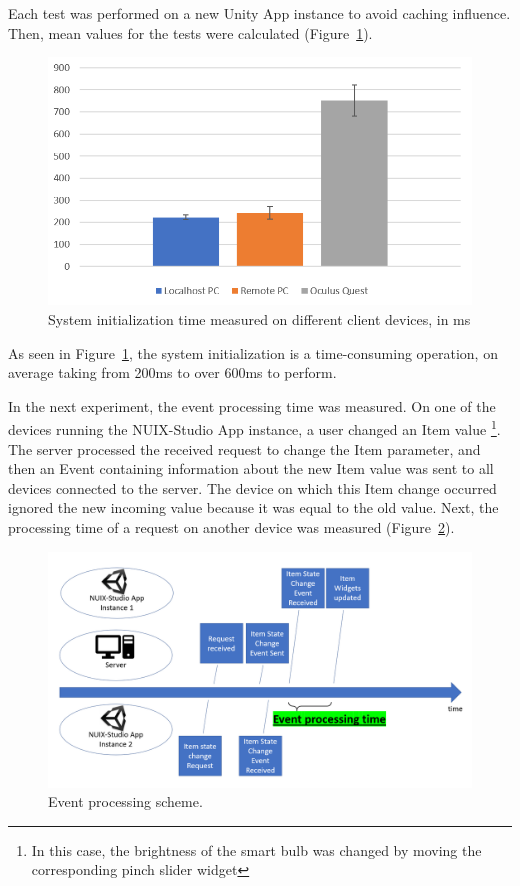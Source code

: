 Each test was performed on a new Unity App instance to avoid caching influence. Then, mean values for the tests were calculated (Figure~\ref{fig:SystemInitTime-figure}).

\begin{figure}
  \centering
  \includegraphics[width=0.9\linewidth]{figures/SystemInitTime.png}
  \caption{System initialization time measured on different client devices, in ms}
  \label{fig:SystemInitTime-figure}
\end{figure}

As seen in Figure~\ref{fig:SystemInitTime-figure}, the system initialization is a time-consuming operation, on average taking from 200ms to over 600ms to perform.

In the next experiment, the event processing time was measured. On one of the devices running the NUIX-Studio App instance, a user changed an Item value \footnote{In this case, the brightness of the smart bulb was changed by moving the corresponding pinch slider widget}. The server processed the received request to change the Item parameter, and then an Event containing information about the new Item value was sent to all devices connected to the server. The device on which this Item change occurred ignored the new incoming value because it was equal to the old value. Next, the processing time of a request on another device was measured (Figure~\ref{fig:EventProcessingScheme-figure}).

\begin{figure}
  \centering
  \includegraphics[width = 0.9 \linewidth]{figures/EventProcessingScheme.png}
  \caption{Event processing scheme.}
  \label{fig:EventProcessingScheme-figure}
\end{figure}

